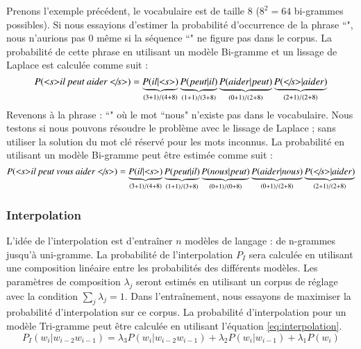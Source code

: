 \documentclass{KodeBook}
\begin{document}
Prenons l'exemple précédent, le vocabulaire est de taille $8$ ($8^2 = 64$ bi-grammes possibles).
Si nous essayions d'estimer la probabilité d'occurrence de la phrase ``", nous n'aurions pas $0$ même si la séquence ``" ne figure pas dans le corpus.
La probabilité de cette phrase en utilisant un modèle Bi-gramme et un lissage de Laplace est calculée comme suit : 
\[
P(\text{\textit{\textless s\textgreater il peut aider \textless/s\textgreater}}) = 
\underbrace{P(il|\text{\textit{\textless s\textgreater}})}_{(3+1)/(4+8)}
\underbrace{P(peut|il)}_{(1+1)/(3+8)} 
\underbrace{P(aider|peut)}_{(0+1)/(2+8)}
\underbrace{P(\text{\textit{\textless/s\textgreater}}|aider)}_{(2+1)/(2+8)}
\]
%
Revenons à la phrase : 
``" où le mot ``nous" n'existe pas dans le vocabulaire. 
Nous testons si nous pouvons résoudre le problème avec le lissage de Laplace ; sans utiliser la solution du mot clé réservé pour les mots inconnus.
La probabilité en utilisant un modèle Bi-gramme peut être estimée comme suit : 
\[
P(\text{\textit{\textless s\textgreater il peut vous aider \textless/s\textgreater}}) = 
\underbrace{P(il|\text{\textit{\textless s\textgreater}})}_{(3+1)/(4+8)}
\underbrace{P(peut|il)}_{(1+1)/(3+8)} 
\underbrace{P(nous|peut)}_{(0+1)/(0+8)} 
\underbrace{P(aider|nous)}_{(0+1)/(2+8)}
\underbrace{P(\text{\textit{\textless/s\textgreater}}|aider)}_{(2+1)/(2+8)}
\]

\subsubsection{Interpolation}

L'idée de l'interpolation est d'entraîner $n$ modèles de langage : de n-grammes jusqu'à uni-gramme. 
La probabilité de l'interpolation $P_I$ sera calculée en utilisant une composition linéaire entre les probabilités des différents modèles. 
Les paramètres de composition $\lambda_j$ seront estimés en utilisant un corpus de réglage avec la condition $\sum_j \lambda_j = 1$.
Dans l'entraînement, nous essayons de maximiser la probabilité d'interpolation sur ce corpus.
La probabilité d'interpolation pour un modèle Tri-gramme peut être calculée en utilisant l'équation \ref{eq:interpolation}. 
\begin{equation}
	P_{I}(w_i | w_{i-2} w_{i-1}) = 
	\lambda_3 P(w_i | w_{i-2} w_{i-1}) 
	+ \lambda_2 P(w_i | w_{i-1}) 
	+ \lambda_1 P(w_i) 
	\label{eq:interpolation}
\end{equation}
\end{document}

